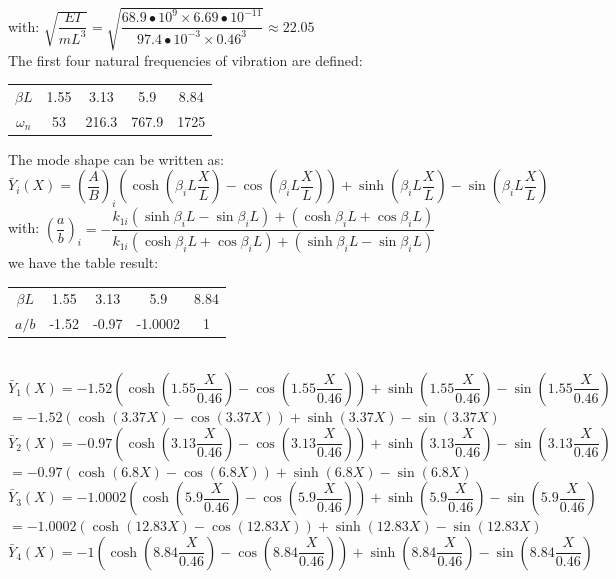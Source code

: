\documentclass[14pt,a4paper]{article}
\begin{document}
\begin{enumerate}
	with: \hspace{1cm} 	$\sqrt{\dfrac{EI}{mL^3}} = \sqrt{\dfrac{68.9\bullet 10^9 \times 6.69\bullet 10^{-11}}{97.4\bullet10^{-3}\times 0.46^3}} \approx 22.05$\\
	The first four natural frequencies of vibration are defined:
	\begin{center}
	\begin{tabular} {c c c c c}
		$\beta L$ & 1.55 & 3.13 & 5.9 & 8.84 \\
		$\omega_n$ & 53 & 216.3 & 767.9 & 1725
	\end{tabular}
	\end{center}
	The mode shape can be written as:\\
	$\bar{Y}_i(X) = \left(\dfrac{A}{B}\right)_i\left(\cosh(\beta_iL\dfrac{X}{L}) - \cos(\beta_iL\dfrac{X}L)\right) + \sinh(\beta_iL\dfrac{X}{L}) - \sin(\beta_iL\dfrac{X}{L})$\\
	with: 	$\left(\dfrac{a}{b}\right)_i = -\dfrac{k_{1i}(\sinh\beta_iL - \sin\beta_iL) + (\cosh\beta_iL + \cos\beta_iL)}{k_{1i}(\cosh\beta_iL + \cos\beta_iL) + (\sinh\beta_iL - \sin\beta_iL)}$\\
	we have the table result:
	\begin{tabular} {c c c c c}
		$\beta L$ & 1.55 & 3.13 & 5.9 & 8.84 \\
		$a/b$ & -1.52 & -0.97 & -1.0002 & 1
	\end{tabular}\\
	$\bar{Y}_1(X) = -1.52\left(\cosh(1.55\dfrac{X}{0.46}) - \cos(1.55\dfrac{X}{0.46})\right) + \sinh(1.55\dfrac{X}{0.46}) - \sin(1.55\dfrac{X}{0.46})$\\	
	\hspace*{0.9cm} $= -1.52\left(\cosh(3.37X) - \cos(3.37X)\right) + \sinh(3.37X) - \sin(3.37X)$\\	
	$\bar{Y}_2(X) = -0.97\left(\cosh(3.13\dfrac{X}{0.46}) - \cos(3.13\dfrac{X}{0.46})\right) + \sinh(3.13\dfrac{X}{0.46}) - \sin(3.13\dfrac{X}{0.46})$\\	
	\hspace*{0.9cm} $= -0.97\left(\cosh(6.8X) - \cos(6.8X)\right) + \sinh(6.8X) - \sin(6.8X)$\\
	$\bar{Y}_3(X) = -1.0002\left(\cosh(5.9\dfrac{X}{0.46}) - \cos(5.9\dfrac{X}{0.46})\right) + \sinh(5.9\dfrac{X}{0.46}) - \sin(5.9\dfrac{X}{0.46})$\\	
	\hspace*{0.9cm} $= -1.0002\left(\cosh(12.83X) - \cos(12.83X)\right) + \sinh(12.83X) - \sin(12.83X)$\\
	$\bar{Y}_4(X) = -1\left(\cosh(8.84\dfrac{X}{0.46}) - \cos(8.84\dfrac{X}{0.46})\right) + \sinh(8.84\dfrac{X}{0.46}) - \sin(8.84\dfrac{X}{0.46})$\\	

\end{enumerate}
\end{document}
